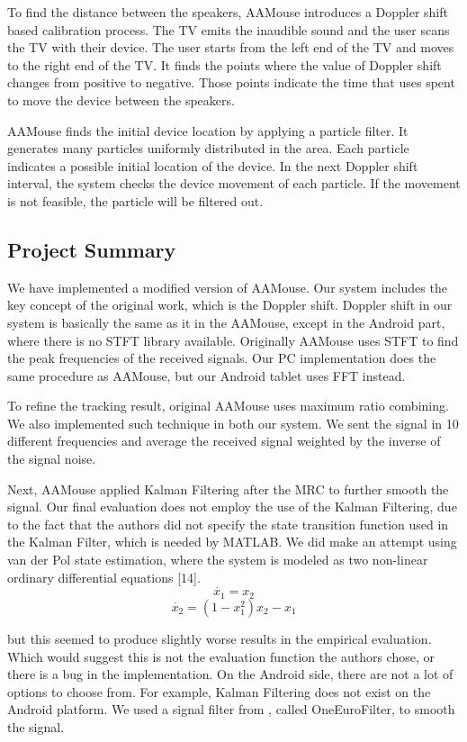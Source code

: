 \documentclass{acm_proc_article-sp}
\begin{document}
To find the distance between the speakers, AAMouse introduces a 
Doppler shift based calibration process. 
The TV emits the inaudible sound and the user scans the TV with their device. The user starts from the left end of the TV and moves to the
right end of the TV.
It finds the points where the 
value of Doppler shift changes from positive to negative. Those points
indicate the time that uses spent to move the device between the
speakers. 

AAMouse finds the initial device location by applying a particle 
filter. It generates many particles uniformly distributed in the 
area. Each particle indicates a possible initial location of the
device. In the next Doppler shift interval, the system checks the 
device movement of each particle. If the movement is not feasible,
the particle will be filtered out.

\subsection{Project Summary}
We have implemented a modified version of AAMouse. Our system includes the key concept
of the original work, which is the Doppler shift. Doppler shift in our system is 
basically the same as it in the AAMouse, except in the Android part, where there is no
STFT library available. Originally AAMouse uses STFT to find the peak frequencies of the
received signals. Our PC implementation does the same procedure as AAMouse, but our 
Android tablet uses FFT instead.

To refine the tracking result, original AAMouse uses maximum ratio combining. We also
implemented such technique in both our system. We sent the signal in 10 different
frequencies and average the received signal weighted by the inverse of the signal noise.

Next, AAMouse applied Kalman Filtering after the MRC to further smooth the signal.
Our final evaluation does not employ the use of the Kalman Filtering, due to the fact that the authors did not specify the state transition function used in the Kalman Filter, which is needed by MATLAB. We did make an attempt using van der Pol state estimation, where the system is modeled as two non-linear ordinary differential equations [14].
$$
\dot{x_1} = x_2
$$
$$
\dot{x_2} = (1-x_1^2) x_2-x_1
$$

but this seemed to produce slightly worse results in the empirical evaluation. Which would suggest this is not the evaluation function the authors chose, or there is a bug in the implementation. 
On the Android side, there are not a lot of options to choose from. For example, 
Kalman Filtering does not exist on the Android platform.
We used a signal
filter from \cite{SignalFilter}, called OneEuroFilter, to smooth the signal.
\end{document}
